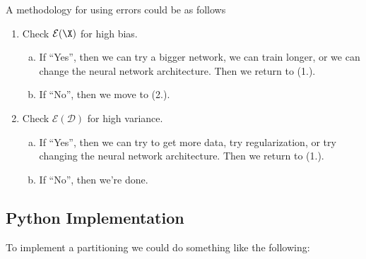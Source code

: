 A methodology for using errors could be as follows
\begin{enumerate}[1.]
	\item Check $\mathcal{E}(\X)$ for high bias.
		\begin{enumerate}[a.]
			\item If ``Yes'', then we can try a bigger network, we can train longer, or we can change the neural network architecture. Then we return to (1.).
			\item If ``No'', then we move to (2.).
		\end{enumerate}
	\item Check $\mathcal{E}(\mathcal{D})$ for high variance.
		\begin{enumerate}[a.]
			\item If ``Yes'', then we can try to get more data, try regularization, or try changing the neural network architecture.  Then we return to (1.).
			\item If ``No'', then we're done.
		\end{enumerate}
\end{enumerate}


\subsection{Python Implementation}

To implement a partitioning we could do something like the following:



